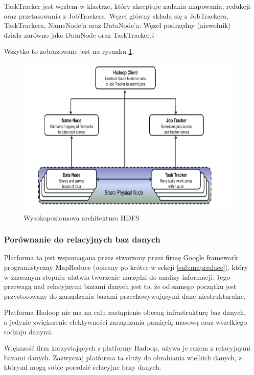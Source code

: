 TaskTracker jest węzłem w klastrze, który akceptuje zadania mapowania, redukcji oraz przetasowania z JobTrackera. Węzeł główny składa się z JobTrackera, TaskTrackera, NameNode'a oraz DataNode'a. Węzeł podrzędny (niewolnik) działa zarówno jako DataNode oraz TaskTracker.ś

Wszytko to zobrazowane jest na rysunku \ref{fig:hdfs_hight_level_architecture}.

\begin{figure}[h]
\centerline{\includegraphics[scale=0.5]{obrazki/wysokopoziomowa_architektura_hadoop.png}}
\caption{Wysokopoziomowa architektura HDFS}
\label{fig:hdfs_hight_level_architecture}
\end{figure}


\subsubsection{Porównanie do relacyjnych baz danych}
\label{ssub:porownanie_z_relacyjnymi}
Platforma ta jest wspomagana przez stworzony przez firmę Google framework programistyczny MapReduce (opisany po krótce w sekcji \ref{sub:mapreduce}), który w znacznym stopniu ułatwia tworzenie narzędzi do analizy informacji. Jego przewagą nad relacyjnymi bazami danych jest to, że od samego początku jest przystosowany do zarządzania bazami przechowywującymi dane niestrukturalne.

Platforma Hadoop nie ma na calu zastąpienie obecną infrastrukturę baz danych, a jedynie zwiększenie efektywności zarządzania pamięcią masową oraz wszelkiego rodzaju danymi.

Większość firm korzystających z platformy Hadoop, używa je razem z relacyjnymi bazami danych. Zazwyczaj platforma ta służy do obrabiania wielkich danych, z którymi mogą sobie poradzić relacyjne bazy danych.


